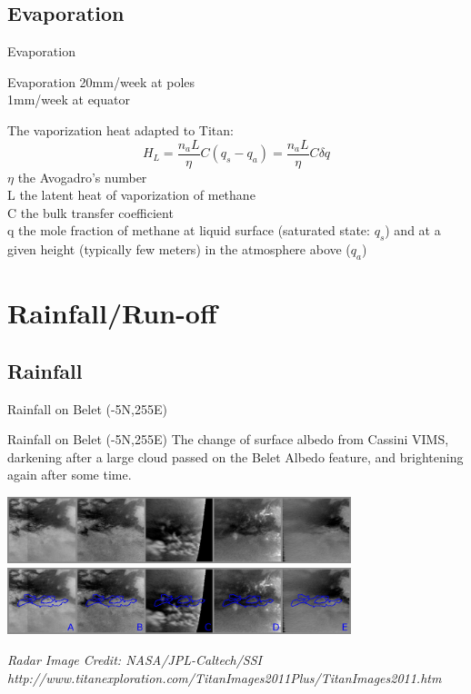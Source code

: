 \documentclass[xcolor=dvipsnames,beamer]{beamer} %
\begin{document}
\subsection{Evaporation}
\begin{frame}[fragile]{Evaporation}
\begin{block}{Evaporation}
20mm/week at poles\\
1mm/week at equator\\
\end{block}
\begin{block}{The vaporization heat adapted to Titan:}
\begin{equation}
H_L = \frac {n_a L}{\eta} C \left( q_s - q_a \right) =  \frac {n_a L}{\eta} C \delta q
\end{equation}
$\eta$ the Avogadro's number\\
L the latent heat of vaporization of methane\\
C the bulk transfer coefficient\\
q the mole fraction of methane at liquid surface (saturated state: $q_s$) and at a given height (typically few meters) in the atmosphere above ($q_a$)
\end{block}
\end{frame}

\section{Rainfall/Run-off}
\subsection{Rainfall}
\begin{frame}[fragile]{Rainfall on Belet (-5N,255E)}
\begin{block}{Rainfall on Belet (-5N,255E)}
The change of surface albedo from Cassini VIMS, darkening after a large cloud passed on the Belet Albedo feature, and brightening again after some time.
\begin{center}
  \includegraphics[width=10cm]{images/WetBeletStormInBeletWithoutOutline150111}
  \vspace{5mm}
  \includegraphics[width=10cm]{images/WetBeletStormInBeletAnnotatedHighRes150111}
\end{center}
{\tiny \it Radar Image Credit: NASA/JPL-Caltech/SSI\\http://www.titanexploration.com/TitanImages2011Plus/TitanImages2011.htm}
\end{block}
\end{frame}
\end{document}
